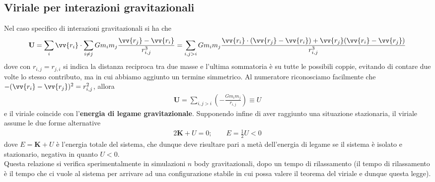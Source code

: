 \documentclass[a4paper, oneside]{book}
\begin{document}
\subsection{Viriale per interazioni gravitazionali}
Nel caso specifico di interazioni gravitazionali si ha che 
\begin{gather*}
    \mathbf{U} = \sum_i \vv{r_i} \cdot \sum_{i \neq j} Gm_i m_j \frac{\vv{r_j} - \vv{r_i}  }{r_{i, j}^{3}} = \sum_{i, j > i} Gm_i m_j \frac{\vv{r_i} \cdot (\vv{r_j} - \vv{r_i}  ) + \vv{r_j}(\vv{r_i} -\vv{r_j}  ) }{r_{i, j}^{3}} 
\end{gather*}
dove con $r_{i, j} = r_{j,i}$ si indica la distanza reciproca tra due masse e l'ultima sommatoria è 
su tutte le possibili coppie, evitando di contare due volte lo stesso contributo, 
ma in cui abbiamo aggiunto un termine simmetrico. Al numeratore riconosciamo facilmente 
che$-(\vv{r_i} - \vv{r_j}  )^{2} = r_{i, j}^{2}$, allora 
\begin{align}
    \mathbf{U} = \sum_{i, j > i} \left(-\frac{Gm_i m_j}{r_{i, j}}\right) \equiv U
\end{align}
e il viriale coincide con l'\textbf{energia di legame gravitazionale}. Supponendo infine di aver raggiunto una 
situazione stazionaria, il viriale assume le due forme alternative
\begin{align}
    2\mathbf{K} + U = 0; \qquad E = \frac{1}{2}U < 0
\end{align}
dove $E = \mathbf{K} + U$ è l'energia totale del sistema, che dunque deve risultare pari a metà dell'energia di legame se
il sistema è isolato e stazionario, negativa in quanto $U < 0$. \\
Questa relazione si verifica sperimentalmente in simulazioni $n$ body gravitazionali, dopo un tempo di rilassamento
(il tempo di rilassamento è il tempo che ci vuole al sistema per arrivare ad una configurazione stabile in cui possa
valere il teorema del viriale e dunque questa legge).
\end{document}
